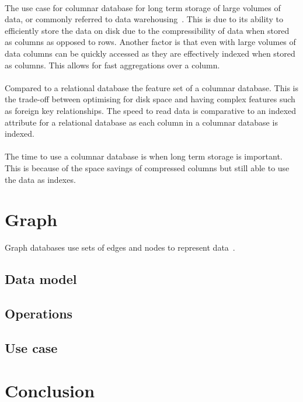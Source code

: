 \documentclass{CRPITStyle}
\renewcommand{\cite}{\citep}
\begin{document}
\paragraph{}
The use case for columnar database for long term storage of large volumes of
data, or commonly referred to data warehousing~\cite{usingcolumn,bigtable}.
This is due to its ability to efficiently store the data on disk
due to the compressibility of data when stored as columns as opposed
to rows.
Another factor is that even with large volumes of data columns can
be quickly accessed as they are effectively indexed when stored as
columns.
This allows for fast aggregations over a column.

\paragraph{}
Compared to a relational database the feature set of a columnar database.
This is the trade-off between optimising for disk space and having
complex features such as foreign key relationships.
The speed to read data is comparative to an indexed attribute
for a relational database as each column in a columnar database is
indexed.

\paragraph{}
The time to use a columnar database is when long term storage is important.
This is because of the space savings of compressed columns but still able
to use the data as indexes.


\section{Graph}

Graph databases use sets of edges and nodes to represent
data~\cite{nosql_survey}.


\subsection{Data model}

\subsection{Operations}


\subsection{Use case}

\cite{nosql_performance}

\section{Conclusion}



\end{document}
